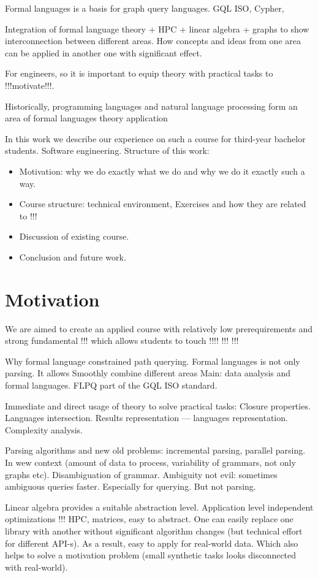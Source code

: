 \documentclass[sigconf]{acmart}
\begin{document}
Formal languages is a basis for graph query languages. 
GQL ISO, Cypher, 

Integration of formal language theory + HPC + linear algebra + graphs to show interconnection between different areas.
How concepts and ideas from one area can be applied in another one with significant effect. 

For engineers, so it is important to equip theory with practical tasks to !!!motivate!!!. 

Historically, programming languages and natural language processing form an area of formal languages theory application 

In this work we describe our experience on such a course for third-year bachelor students.
Software engineering.
Structure of this work:
\begin{itemize}
  \item Motivation: why we do exactly what we do and why we do it exactly such a way. 
  \item Course structure: technical environment, Exercises and how they are related to !!!
  \item Discussion of existing course. 
  \item Conclusion and future work.
\end{itemize}  

\section{Motivation}

We are aimed to create an applied course with relatively low prerequirements and strong fundamental !!! which allows students to touch !!!! !!! !!!

Why formal language constrained path querying. 
Formal languages is not only parsing. 
It allows Smoothly combine different areas 
Main: data analysis and formal languages.
FLPQ part of the GQL ISO standard.

Immediate and direct usage of theory to solve practical tasks: Closure properties.
Languages intersection.
Results representation --- languages representation.
Complexity analysis.

Parsing algorithms and new old problems: incremental parsing, parallel parsing. In wew context (amount of data to process, variability of grammars, not only graphs etc).
Disambiguation of grammar.
Ambiguity not evil: sometimes ambiguous queries faster.
Especially for querying.
But not parsing.

Linear algebra provides a suitable abstraction level. Application level independent optimizations !!! HPC, matrices, easy to abstract.
One can easily replace one library with another without significant algorithm changes (but technical effort for different API-s).
As a result, easy to apply for real-world data.
Which also helps to solve a motivation problem (small synthetic tasks looks disconnected with real-world).
\end{document}
